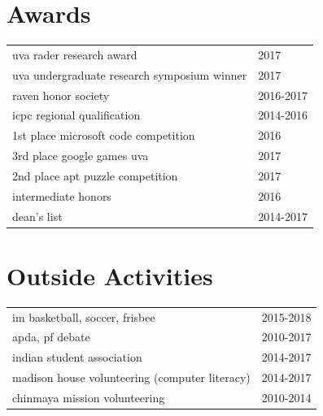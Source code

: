 \begin{minipage}[t]{0.675\textwidth}
\sectionspace %

\section{Awards} 
\begin{tabular}{m{7.5cm}l}
uva rader research award & 2017\\
uva undergraduate research symposium winner & 2017\\
raven honor society & 2016-2017\\
icpc regional qualification & 2014-2016\\
1st place microsoft code competition & 2016\\
3rd place google games uva & 2017\\
2nd place apt puzzle competition & 2017\\
intermediate honors & 2016\\
dean's list & 2014-2017\\
\end{tabular}
\sectionspace %

\section{Outside Activities} 
\begin{tabular}{m{7.5cm}l}
im basketball, soccer, frisbee & 2015-2018\\
apda, pf debate & 2010-2017\\
indian student association & 2014-2017\\
madison house volunteering (computer literacy) & 2014-2017 \\
chinmaya mission volunteering & 2010-2014
\end{tabular}

\end{minipage} %
\vspace*{\fill}
\center{\textcolor{gray}{2/2}}
